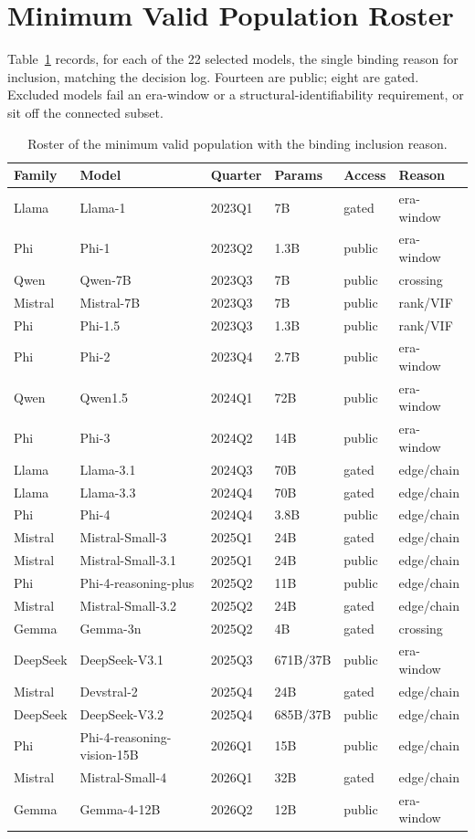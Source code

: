 \documentclass{ieeeaccess}
\theoremstyle{definition}
\theoremstyle{plain}
\begin{document}
\section{Minimum Valid Population Roster}
Table~\ref{tab:roster} records, for each of the 22 selected models, the single
binding reason for inclusion, matching the decision log. Fourteen are public;
eight are gated. Excluded models fail an era-window or a structural-identifiability
requirement, or sit off the connected subset.
\begin{table}[t]
\caption{Roster of the minimum valid population with the binding inclusion reason.}
\label{tab:roster}
\centering
\renewcommand{\arraystretch}{1.15}
\setlength{\tabcolsep}{2pt}
\scriptsize
\begin{tabular}{@{}llllll@{}}
\hline
Family & Model & Quarter & Params & Access & Reason \\
\hline
Llama & Llama-1 & 2023Q1 & 7B & gated & era-window \\
Phi & Phi-1 & 2023Q2 & 1.3B & public & era-window \\
Qwen & Qwen-7B & 2023Q3 & 7B & public & crossing \\
Mistral & Mistral-7B & 2023Q3 & 7B & public & rank/VIF \\
Phi & Phi-1.5 & 2023Q3 & 1.3B & public & rank/VIF \\
Phi & Phi-2 & 2023Q4 & 2.7B & public & era-window \\
Qwen & Qwen1.5 & 2024Q1 & 72B & public & era-window \\
Phi & Phi-3 & 2024Q2 & 14B & public & era-window \\
Llama & Llama-3.1 & 2024Q3 & 70B & gated & edge/chain \\
Llama & Llama-3.3 & 2024Q4 & 70B & gated & edge/chain \\
Phi & Phi-4 & 2024Q4 & 3.8B & public & edge/chain \\
Mistral & Mistral-Small-3 & 2025Q1 & 24B & gated & edge/chain \\
Mistral & Mistral-Small-3.1 & 2025Q1 & 24B & public & edge/chain \\
Phi & Phi-4-reasoning-plus & 2025Q2 & 11B & public & edge/chain \\
Mistral & Mistral-Small-3.2 & 2025Q2 & 24B & gated & edge/chain \\
Gemma & Gemma-3n & 2025Q2 & 4B & gated & crossing \\
DeepSeek & DeepSeek-V3.1 & 2025Q3 & 671B/37B & public & era-window \\
Mistral & Devstral-2 & 2025Q4 & 24B & gated & edge/chain \\
DeepSeek & DeepSeek-V3.2 & 2025Q4 & 685B/37B & public & edge/chain \\
Phi & Phi-4-reasoning-vision-15B & 2026Q1 & 15B & public & edge/chain \\
Mistral & Mistral-Small-4 & 2026Q1 & 32B & gated & edge/chain \\
Gemma & Gemma-4-12B & 2026Q2 & 12B & public & era-window \\
\hline
\end{tabular}
\end{table}
\end{document}
